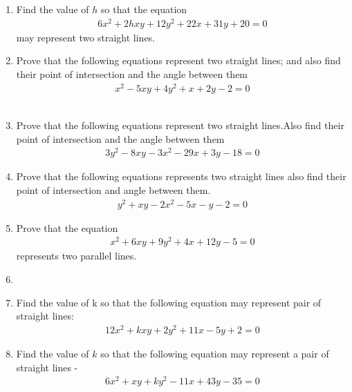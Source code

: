 \renewcommand{\theequation}{\theenumi}
\renewcommand{\thefigure}{\theenumi}
\begin{enumerate}[label=\thesection.\arabic*.,ref=\thesection.\theenumi]
%
\item 
Find the value of $h$ so that the equation 
\begin{align}
6x^2+2hxy+12y^2+22x+31y+20=0
\label{eq:solutions/13/ex2/question}
\end{align}
 may represent two straight lines.
\\
\solution

\item Prove that the following equations represent two straight lines; and also find their point of intersection and the angle between them
\begin{align}\nonumber
    x^2-5xy+4y^2+x+2y-2=0
\end{align}
\\
\solution

\item Prove that the following equations represent two straight lines.Also find their point of intersection and the angle between them
\begin{align}
 3y^2-8xy-3x^2-29x+3y-18=0   
\label{eq:solutions/13/3/1}
\end{align}
\solution

\item Prove that the following equations represents two straight lines also find their point of intersection and angle between them.
\begin{align}
y^2+xy-2x^2-5x-y-2=0
\end{align}
%
\solution

\item Prove that the equation
\begin{align} 
    x^{2}+6xy+9y^{2}+4x+12y-5=0 \label{eq:solutions/13/5/eq:0}
\end{align}
represents two parallel lines.

\solution

\item 
%
\solution

\item Find the value of k so that the following equation may represent pair of straight lines: 
\begin{align}
    12x^2+kxy+2y^2+11x-5y+2=0\label{eq:solutions/13/8/1.1}
\end{align}
\solution

%
\item Find the value of $k$ so that the following equation may represent a pair of straight lines - 
\begin{align}
6x^2 +xy+ky^2-11x+43y-35 = 0 \label{eq:solutions/13/94}
\end{align}
\solution



\end{enumerate}

